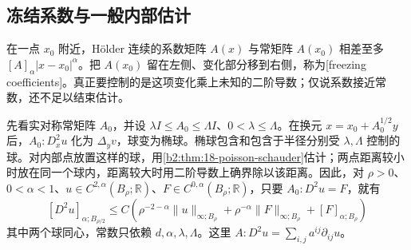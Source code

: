 \subsection{冻结系数与一般内部估计}
\label{b2:subsec:160503}

在一点 \(x_0\) 附近，Hölder 连续的系数矩阵 \(A(x)\) 与常矩阵 \(A(x_0)\) 相差至多 \([A]_\alpha|x-x_0|^\alpha\)。把 \(A(x_0)\) 留在左侧、变化部分移到右侧，称为[freezing coefficients]。真正要控制的是这项变化乘上未知的二阶导数；仅说系数接近常数，还不足以结束估计。

\ProseParagraphBreak
先看实对称常矩阵 \(A_0\)，并设 \(\lambda I\le A_0\le\Lambda I\)、\(0<\lambda\le\Lambda\)。在换元 \(x=x_0+A_0^{1/2}y\) 后，\(A_0:D_x^2u\) 化为 \(\Delta_yv\)，球变为椭球。椭球包含和包含于半径分别受 \(\lambda,\Lambda\) 控制的球。对内部点放置这样的球，用\cref{b2:thm:18-poisson-schauder}估计；两点距离较小时放在同一个球内，距离较大时用二阶导数上确界除以该距离。因此，对 \(\rho>0\)、\(0<\alpha<1\)、\(u\in C^{2,\alpha}(B_\rho;\mathbb R)\)、\(F\in C^{0,\alpha}(B_\rho;\mathbb R)\)，只要 \(A_0:D^2u=F\)，就有
\begin{equation}
\label{b2:eq:18-constant-coefficient}
 [D^2u]_{\alpha;B_{\rho/2}}
 \le C\left(\rho^{-2-\alpha}\|u\|_{\infty;B_\rho}
       +\rho^{-\alpha}\|F\|_{\infty;B_\rho}
       +[F]_{\alpha;B_\rho}\right)
\end{equation}
其中两个球同心，常数只依赖 \(d,\alpha,\lambda,\Lambda\)。这里 \(A:D^2u=\sum_{i,j}a^{ij}\partial_{ij}u\)。

